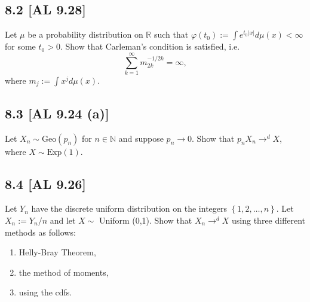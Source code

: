 \documentclass[12pt]{article}
\begin{document}
\subsection*{8.2 [AL 9.28]}
\begin{tcolorbox}
Let $\mu$ be a probability distribution on $\mathbb{R}$ such that $\varphi(t_0) := \int e^{t_0|x|}d\mu(x) < \infty$ for some $t_0 > 0$. Show that
Carleman's condition is satisfied, i.e.
\[ \sum_{k=1}^{\infty}m_{2k}^{-1/2k} = \infty, \]
where $m_{j} := \int x^{j}d\mu(x)$.
\end{tcolorbox}



\subsection*{8.3 [AL 9.24 (a)]}
\begin{tcolorbox}
Let $X_n \sim \text{Geo}(p_n)$ for $n\in\mathbb{N}$ and suppose $p_n \rightarrow 0$. Show that $p_n X_n \rightarrow^{d} X$, where $X \sim
\text{Exp}(1)$.
\end{tcolorbox}



\newpage
\subsection*{8.4 [AL 9.26]}
\begin{tcolorbox}
Let $Y_n$ have the discrete uniform distribution on the integers $\left\{ 1,2,\hdots, n \right\}$. Let $X_n := Y_n / n$ and let $X \sim$ Uniform (0,1).
Show that $X_n \rightarrow^{d} X$ using three different methods as follows:
\begin{enumerate}[label = (\alph*)]
\item Helly-Bray Theorem,
\item the method of moments,
\item using the cdfs.
\end{enumerate}
\end{tcolorbox}
\end{document}
